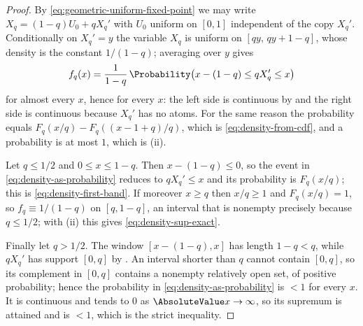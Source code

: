 \documentclass[11pt,a4paper,oneside,openany]{book}
\theoremstyle{definition}
\theoremstyle{remark}
\begin{document}
\begin{proof}
By \eqref{eq:geometric-uniform-fixed-point} we may write $X_q=(1-q)U_0+qX_q'$ with $U_0$
uniform on $[0,1]$ independent of the copy $X_q'$.  Conditionally on $X_q'=y$ the variable
$X_q$ is uniform on $[qy,\,qy+1-q]$, whose density is the constant $1/(1-q)$; averaging
over $y$ gives
\begin{equation}\label{eq:density-as-probability}
 f_q(x)=\frac1{1-q}\,\Probability\bigl(x-(1-q)\le qX_q'\le x\bigr)
\end{equation}
for almost every $x$, hence for every $x$: the left side is continuous by
 and the right side is continuous because
$X_q'$ has no atoms.  For the same reason the probability equals
$F_q(x/q)-F_q((x-1+q)/q)$, which is \eqref{eq:density-from-cdf}, and a probability is at
most $1$, which is (ii).

Let $q\le1/2$ and $0\le x\le1-q$.  Then $x-(1-q)\le0$, so the event in
\eqref{eq:density-as-probability} reduces to $qX_q'\le x$ and its probability is
$F_q(x/q)$; this is \eqref{eq:density-first-band}.  If moreover $x\ge q$ then $x/q\ge1$
and $F_q(x/q)=1$, so $f_q\equiv1/(1-q)$ on $[q,1-q]$, an interval that is nonempty
precisely because $q\le1/2$; with (ii) this gives \eqref{eq:density-sup-exact}.

Finally let $q>1/2$.  The window $[x-(1-q),x]$ has length $1-q<q$, while $qX_q'$ has
support $[0,q]$ by .  An interval shorter than $q$
cannot contain $[0,q]$, so its complement in $[0,q]$ contains a nonempty relatively open
set, of positive probability; hence the probability in
\eqref{eq:density-as-probability} is $<1$ for every $x$.  It is continuous and tends to
$0$ as $\AbsoluteValue x\to\infty$, so its supremum is attained and is $<1$, which is the strict
inequality.
\end{proof}
\end{document}
